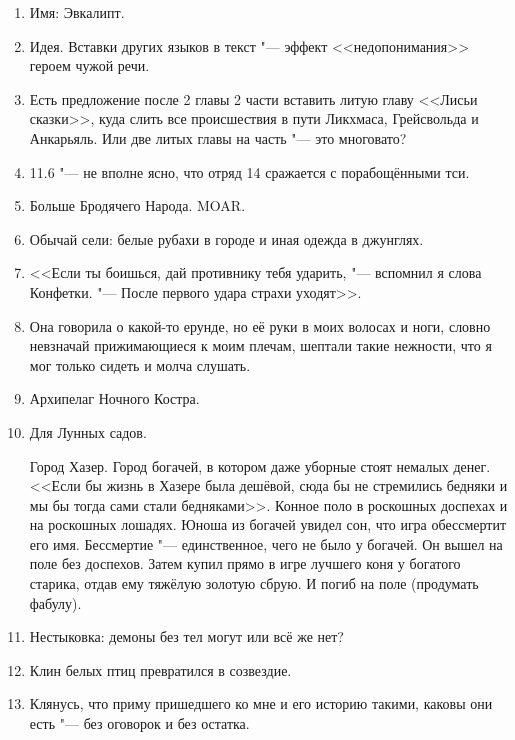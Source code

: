 \documentclass[a4paper,10pt]{book}
\begin{document}
\begin{enumerate}
\item Имя: Эвкалипт.

\item Идея. Вставки других языков в текст "--- эффект <<недопонимания>> героем чужой речи.

\item Есть предложение после 2 главы 2 части вставить литую главу <<Лисьи сказки>>, куда слить все происшествия в пути Ликхмаса, Грейсвольда и Анкарьяль. Или две литых главы на часть "--- это многовато?

\item 11.6 "--- не вполне ясно, что отряд 14 сражается с порабощёнными тси.

\item Больше Бродячего Народа. MOAR.

\item Обычай сели: белые рубахи в городе и иная одежда в джунглях.

\item <<Если ты боишься, дай противнику тебя ударить, "--- вспомнил я слова Конфетки. "--- После первого удара страхи уходят>>.

\item Она говорила о какой-то ерунде, но её руки в моих волосах и ноги, словно невзначай прижимающиеся к моим плечам, шептали такие нежности, что я мог только сидеть и молча слушать.

\item Архипелаг Ночного Костра.

\item Для Лунных садов.

Город Хазер. Город богачей, в котором даже уборные стоят немалых денег. <<Если бы жизнь в Хазере была дешёвой, сюда бы не стремились бедняки и мы бы тогда сами стали бедняками>>. Конное поло в роскошных доспехах и на роскошных лошадях. Юноша из богачей увидел сон, что игра обессмертит его имя. Бессмертие "--- единственное, чего не было у богачей. Он вышел на поле без доспехов. Затем купил прямо в игре лучшего коня у богатого старика, отдав ему тяжёлую золотую сбрую. И погиб на поле (продумать фабулу).

\item Нестыковка: демоны без тел могут или всё же нет?

\item Клин белых птиц превратился в созвездие.

\item Клянусь, что приму пришедшего ко мне и его историю такими, каковы они есть "--- без оговорок и без остатка.


\end{enumerate}
\end{document}
